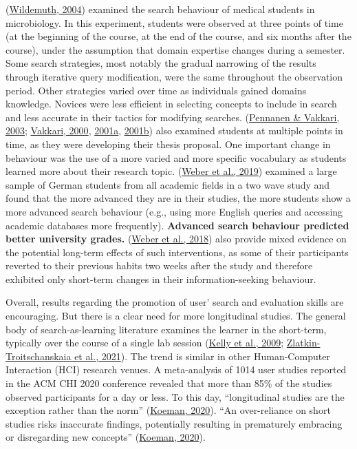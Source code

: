 \documentclass[letterpaper, nobind]{templates/ociamthesis}
\begin{document}
(\protect\hyperlink{ref-wildemuth2004effects}{Wildemuth, 2004}) examined the search behaviour of medical
students in microbiology. In this experiment, students were observed at
three points of time (at the beginning of the course, at the end of the
course, and six months after the course), under the assumption that
domain expertise changes during a semester. Some search strategies, most
notably the gradual narrowing of the results through iterative query
modification, were the same throughout the observation period. Other
strategies varied over time as individuals gained domains knowledge.
Novices were less efficient in selecting concepts to include in search
and less accurate in their tactics for modifying searches.
(\protect\hyperlink{ref-pennanen2003students}{Pennanen \& Vakkari, 2003}; \protect\hyperlink{ref-vakkari2000cognition}{Vakkari, 2000}, \protect\hyperlink{ref-vakkari2001changes}{2001a}, \protect\hyperlink{ref-vakkari2001theory}{2001b})
also examined students at multiple points in time, as they were
developing their thesis proposal. One important change in behaviour was
the use of a more varied and more specific vocabulary as students
learned more about their research topic. (\protect\hyperlink{ref-weber2019informationseeking}{Weber et al., 2019})
examined a large sample of German students from all academic fields in a
two wave study and found that the more advanced they are in their
studies, the more students show a more advanced search behaviour (e.g.,
using more English queries and accessing academic databases more
frequently). \textbf{Advanced search behaviour predicted better university
grades.} (\protect\hyperlink{ref-weber2018can}{Weber et al., 2018}) also provide mixed evidence on the potential
long-term effects of such interventions, as some of their participants
reverted to their previous habits two weeks after the study and
therefore exhibited only short-term changes in their information-seeking
behaviour.

Overall, results regarding the promotion of user' search and evaluation
skills are encouraging. But there is a clear need for more longitudinal
studies. The general body of search-as-learning literature examines the
learner in the short-term, typically over the course of a single lab
session (\protect\hyperlink{ref-kelly2009evaluation}{Kelly et al., 2009}; \protect\hyperlink{ref-zlatkin2021students}{Zlatkin-Troitschanskaia et al., 2021}). The trend is
similar in other Human-Computer Interaction (HCI) research venues. A
meta-analysis of 1014 user studies reported in the ACM CHI 2020
conference revealed that more than 85\% of the studies observed
participants for a day or less. To this day, ``longitudinal studies are
the exception rather than the norm'' (\protect\hyperlink{ref-koeman2020hciux}{Koeman, 2020}). ``An
over-reliance on short studies risks inaccurate findings, potentially
resulting in prematurely embracing or disregarding new concepts''
(\protect\hyperlink{ref-koeman2020hciux}{Koeman, 2020}).
\end{document}
